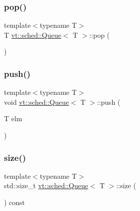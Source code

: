 \mbox{\label{structvt_1_1sched_1_1_queue_ad5e435489eb04cd78a2da6acfa855331}} 
\subsubsection{\texorpdfstring{pop()}{pop()}}
{\footnotesize\ttfamily template$<$typename T$>$ \\
T \hyperlink{structvt_1_1sched_1_1_queue}{vt\+::sched\+::\+Queue}$<$ T $>$\+::pop (\begin{DoxyParamCaption}{ }\end{DoxyParamCaption})\hspace{0.3cm}{\ttfamily [inline]}}

\mbox{\label{structvt_1_1sched_1_1_queue_a5079f0b8b665ec528767a12ab210d1be}} 
\subsubsection{\texorpdfstring{push()}{push()}}
{\footnotesize\ttfamily template$<$typename T$>$ \\
void \hyperlink{structvt_1_1sched_1_1_queue}{vt\+::sched\+::\+Queue}$<$ T $>$\+::push (\begin{DoxyParamCaption}\item[{T}]{elm }\end{DoxyParamCaption})\hspace{0.3cm}{\ttfamily [inline]}}

\mbox{\label{structvt_1_1sched_1_1_queue_a0d5cd0a31703541be21f3bbd1590464e}} 
\subsubsection{\texorpdfstring{size()}{size()}}
{\footnotesize\ttfamily template$<$typename T$>$ \\
std\+::size\+\_\+t \hyperlink{structvt_1_1sched_1_1_queue}{vt\+::sched\+::\+Queue}$<$ T $>$\+::size (\begin{DoxyParamCaption}{ }\end{DoxyParamCaption}) const\hspace{0.3cm}{\ttfamily [inline]}}

